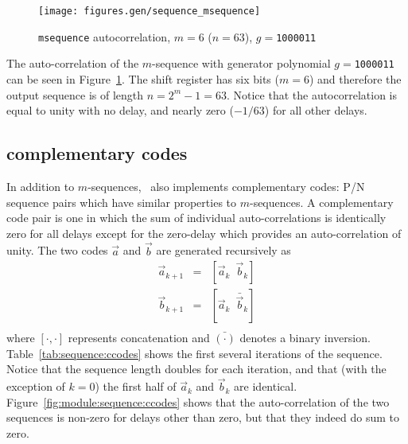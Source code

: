 \begin{figure}
\centering
  \texttt{[image: figures.gen/sequence\_msequence]}
\caption{{\tt msequence} autocorrelation, $m=6$ ($n=63$), $g=${\tt 1000011}}
\label{fig:module:sequence:msequence}
\end{figure}
%
%
%
The auto-correlation of the $m$-sequence with generator polynomial
$g=${\tt 1000011}
can be seen in Figure~\ref{fig:module:sequence:msequence}.
The shift register has six bits ($m=6$) and therefore the output sequence is
of length $n=2^m-1=63$.
Notice that the autocorrelation is equal to unity with no delay, and nearly
zero ($-1/63$) for all other delays.



\subsection{complementary codes}
\label{module:sequence:ccodes}
In addition to $m$-sequences, \liquid\ also implements complementary codes:
P/N sequence pairs which have similar properties to $m$-sequences.
A complementary code pair is one in which the sum of individual
auto-correlations is identically zero for all delays except for the zero-delay
which provides an auto-correlation of unity.
%
The two codes $\vec{a}$ and $\vec{b}$ are generated recursively as
\begin{eqnarray*}
    \vec{a}_{k+1} & = & \left[ \vec{a}_k \,\,\,      \vec{b}_k  \right] \\
    \vec{b}_{k+1} & = & \left[ \vec{a}_k \,\,\, \bar{\vec{b}}_k \right] \\
\end{eqnarray*}
where $[\cdot,\cdot]$ represents concatenation and
$\bar{(\cdot)}$ denotes a binary inversion.
Table~\ref{tab:sequence:ccodes} shows the first several iterations of the
sequence.
Notice that the sequence length doubles for each iteration, and that (with the
exception of $k=0$) the first half of $\vec{a}_k$ and $\vec{b}_k$ are
identical.
Figure~\ref{fig:module:sequence:ccodes} shows that the auto-correlation of the two
sequences is non-zero for delays other than zero, but that they indeed do sum
to zero.

